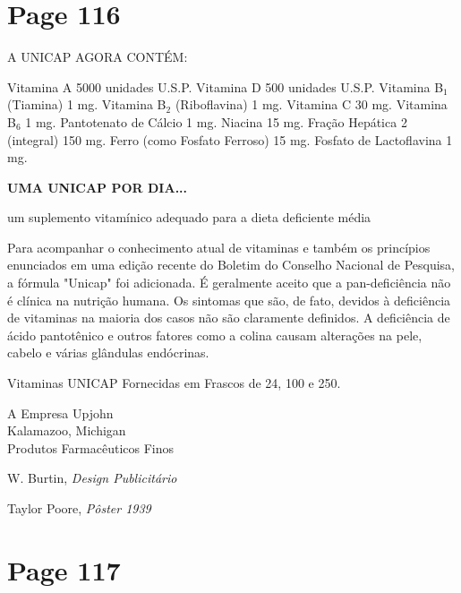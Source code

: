 \documentclass[a4paper]{article}
\begin{document}
\newpage
\section*{Page 116}

\raggedright

A UNICAP AGORA CONTÉM:

Vitamina A 5000 unidades U.S.P.
Vitamina D 500 unidades U.S.P.
Vitamina B$_1$ (Tiamina) 1 mg.
Vitamina B$_2$ (Riboflavina) 1 mg.
Vitamina C 30 mg.
Vitamina B$_6$ 1 mg.
Pantotenato de Cálcio 1 mg.
Niacina 15 mg.
Fração Hepática 2 (integral) 150 mg.
Ferro (como Fosfato Ferroso) 15 mg.
Fosfato de Lactoflavina 1 mg.

\vspace{1em}

\textbf{UMA UNICAP POR DIA...}

um suplemento vitamínico adequado para a dieta deficiente média

\vspace{1em}

Para acompanhar o conhecimento atual de vitaminas e também os princípios enunciados em uma edição recente do Boletim do Conselho Nacional de Pesquisa, a fórmula "Unicap" foi adicionada. É geralmente aceito que a pan-deficiência não é clínica na nutrição humana. Os sintomas que são, de fato, devidos à deficiência de vitaminas na maioria dos casos não são claramente definidos. A deficiência de ácido pantotênico e outros fatores como a colina causam alterações na pele, cabelo e várias glândulas endócrinas.

\vspace{1em}

Vitaminas UNICAP Fornecidas em Frascos de 24, 100 e 250.

\vspace{1em}

A Empresa Upjohn\\
Kalamazoo, Michigan\\
Produtos Farmacêuticos Finos

\vspace{3em}

W. Burtin, \textit{Design Publicitário}

\vspace{3em}

Taylor Poore, \textit{Pôster 1939}

\newpage
\section*{Page 117}
\end{document}
